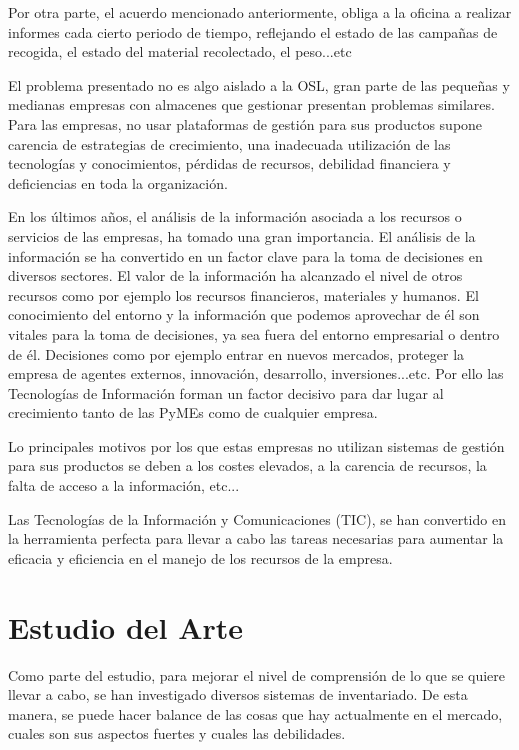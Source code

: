 \documentclass[a4paper,11pt]{book}
\begin{document}
Por otra parte, el acuerdo mencionado anteriormente, obliga a la oficina a realizar informes cada cierto periodo de tiempo, reflejando el estado de las campañas de recogida, el estado del material recolectado, el peso...etc

El problema presentado no es algo aislado a la OSL, gran parte de las pequeñas y medianas empresas con almacenes que gestionar presentan problemas similares. Para las  empresas, no usar plataformas de gestión para sus productos supone carencia de estrategias de crecimiento, una inadecuada utilización de las tecnologías y conocimientos, pérdidas de recursos, debilidad financiera y deficiencias en toda la organización. 

En los últimos años, el análisis de la información asociada a los recursos o servicios de las empresas, ha tomado una gran importancia. El análisis de la información se ha convertido en un factor clave para la toma de decisiones en diversos sectores. El valor de la información ha alcanzado el nivel de otros recursos como por ejemplo los recursos financieros, materiales y humanos. El conocimiento del entorno y la información que podemos aprovechar de él son vitales para la toma de decisiones, ya sea fuera del entorno empresarial o dentro de él. Decisiones como por ejemplo entrar en nuevos mercados, proteger la empresa de agentes externos, innovación, desarrollo, inversiones...etc. Por ello las Tecnologías de Información forman un factor decisivo para dar lugar al crecimiento tanto de las PyMEs como de cualquier empresa.

Lo principales motivos por los que estas empresas no utilizan sistemas de gestión para sus productos se deben a los costes elevados, a la carencia de recursos, la falta de acceso a la información, etc... 

Las Tecnologías de la Información y Comunicaciones (TIC), se han convertido en la herramienta perfecta para llevar a cabo las tareas necesarias para aumentar 
la eficacia y eficiencia en el manejo de los recursos de la empresa.

 
\section{Estudio del Arte}


Como parte del estudio, para mejorar el nivel de comprensión de lo que se quiere llevar a cabo, se han investigado diversos sistemas de inventariado. De esta manera, se puede hacer balance de las cosas que hay actualmente en el mercado, cuales son sus aspectos fuertes y cuales las debilidades. 
\end{document}

